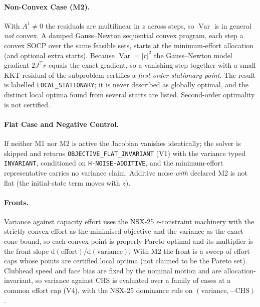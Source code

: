 \documentclass[11pt,a4paper]{article}
\begin{document}
\paragraph{Non-Convex Case (M2).}  With $A^1\neq0$ the residuals are multilinear
in $z$ across steps, so $\operatorname{Var}$ is in general \emph{not} convex.  A
damped Gauss--Newton sequential convex program, each step a convex SOCP over the
same feasible sets, starts at the minimum-effort allocation (and optional extra
starts).  Because $\operatorname{Var}=\lvert r\rvert^2$ the Gauss--Newton model
gradient $2J^{\top}r$ equals the exact gradient, so a vanishing step together
with a small KKT residual of the subproblem certifies a \emph{first-order
stationary point}.  The result is labelled \texttt{LOCAL\_STATIONARY}; it is
never described as globally optimal, and the distinct local optima found from
several starts are listed.  Second-order optimality is not certified.

\paragraph{Flat Case and Negative Control.}  If neither M1 nor M2 is active the
Jacobian vanishes identically; the solver is skipped and returns
\texttt{OBJECTIVE\_FLAT\_INVARIANT} (V1) with the variance typed
\texttt{INVARIANT}, conditioned on \texttt{H-NOISE-ADDITIVE}, and the
minimum-effort representative carries no variance claim.  Additive noise
\emph{with} declared M2 is not flat (the initial-state term moves with $z$).

\paragraph{Fronts.}  Variance against capacity effort uses the NSX-25
$\epsilon$-constraint machinery with the strictly convex effort as the
minimised objective and the variance as the exact cone bound, so each convex
point is properly Pareto optimal and its multiplier is the front slope
$\mathrm{d}(\text{effort})/\mathrm{d}(\text{variance})$.  With M2 the front is a
sweep of effort caps whose points are certified local optima (not claimed to be
the Pareto set).  Clubhead speed and face bias are fixed by the nominal motion
and are allocation-invariant, so variance against CHS is evaluated over a family
of cases at a common effort cap (V4), with the NSX-25 dominance rule on
$(\text{variance},-\text{CHS})$.
\end{document}
